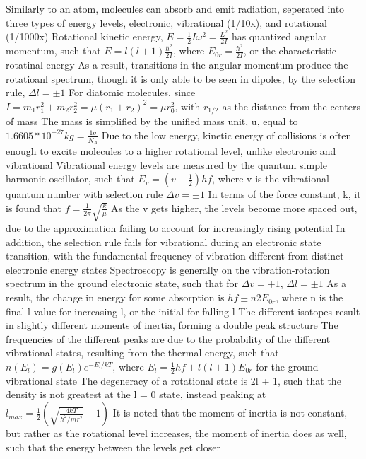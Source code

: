 \documentclass[11 pt, twoside]{article}
\newenvironment{outline*}
{
	\begin{outline}[enumerate]
	}
	{\end{outline}
}
\begin{document}
\begin{outline*}
\1 Similarly to an atom, molecules can absorb and emit radiation, seperated into three types of energy levels, electronic, vibrational (1/10x), and rotational (1/1000x)
	\2 Rotational kinetic energy, $E = \frac{1}{2}I\omega^2 = \frac{L^2}{2I}$ has quantized angular momentum, such that $E = l(l + 1)\frac{\hbar^2}{2I}$, where $E_{0r} = \frac{\hbar^2}{2I}$, or the characteristic rotatinal energy
		\3 As a result, transitions in the angular momentum produce the rotatioanl spectrum, though it is only able to be seen in dipoles, by the selection rule, $\Delta l = \pm 1$
		\3 For diatomic molecules, since $I = m_1r_1^2 + m_2r_2^2 = \mu (r_1 + r_2)^2 = \mu r_0^2$, with $r_{1/2}$ as the distance from the centers of mass
			\4 The mass is simplified by the unified mass unit, u, equal to $1.6605 * 10^{-27} kg = \frac{1 g}{N_A}$
		\3 Due to the low energy, kinetic energy of collisions is often enough to excite molecules to a higher rotational level, unlike electronic and vibrational
	\2 Vibrational energy levels are measured by the quantum simple harmonic oscillator, such that $E_v = (v + \frac{1}{2})hf$, where v is the vibrational quantum number with selection rule $\Delta v = \pm 1$
		\3 In terms of the force constant, k, it is found that $f = \frac{1}{2\pi}\sqrt{\frac{k}{\mu}}$
		\3 As the v gets higher, the levels become more spaced out, due to the approximation failing to account for increasingly rising potential
		\3 In addition, the selection rule fails for vibrational during an electronic state transition, with the fundamental frequency of vibration different from distinct electronic energy states
	\2 Spectroscopy is generally on the vibration-rotation spectrum in the ground electronic state, such that for $\Delta v = +1$, $\Delta l = \pm 1$
		\3 As a result, the change in energy for some absorption is $hf \pm n2E_{0r}$, where n is the final l value for increasing l, or the initial for falling l
		\3 The different isotopes result in slightly different moments of inertia, forming a double peak structure
		\3 The frequencies of the different peaks are due to the probability of the different vibrational states, resulting from the thermal energy, such that $n(E_l) = g(E_l)e^{-E_l/kT}$, where $E_l = \frac{1}{2}hf + l(l+1)E_{0r}$ for the ground vibrational state
			\4 The degeneracy of a rotational state is 2l + 1, such that the density is not greatest at the l = 0 state, instead peaking at $l_{max} = \frac{1}{2}(\sqrt{\frac{4kT}{h^2/mr^2}} - 1)$
		\3 It is noted that the moment of inertia is not constant, but rather as the rotational level increases, the moment of inertia does as well, such that the energy between the levels get closer

\end{outline*}
\end{document}
